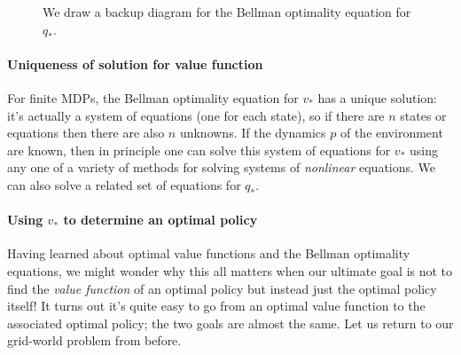 \documentclass[12pt]{article}
\begin{document}
\begin{figure}[h]
  \centering
  \caption{\footnotesize We draw a backup diagram for the Bellman optimality equation for $q_*$.}
\end{figure}

\paragraph{Uniqueness of solution for value function}
For finite MDPs, the Bellman optimality equation for $v_*$ has a unique solution: it's actually a system of equations (one for each state), so if there are $n$ states or equations then there are also $n$ unknowns. If the dynamics $p$ of the environment are known, then in principle one can solve this system of equations for $v_*$ using any one of a variety of methods for solving systems of \emph{nonlinear} equations. We can also solve a related set of equations for $q_*$.

\paragraph{Using $v_*$ to determine an optimal policy}
Having learned about optimal value functions and the Bellman optimality equations, we might wonder why this all matters when our ultimate goal is not to find the \emph{value function} of an optimal policy but instead just the optimal policy itself! It turns out it's quite easy to go from an optimal value function to the associated optimal policy; the two goals are almost the same.
Let us return to our grid-world problem from before.
\end{document}
